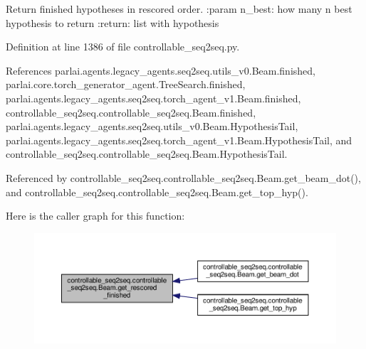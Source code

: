 \begin{DoxyVerb}Return finished hypotheses in rescored order.
:param n_best:
    how many n best hypothesis to return
:return:
    list with hypothesis
\end{DoxyVerb}
 

Definition at line 1386 of file controllable\+\_\+seq2seq.\+py.



References parlai.\+agents.\+legacy\+\_\+agents.\+seq2seq.\+utils\+\_\+v0.\+Beam.\+finished, parlai.\+core.\+torch\+\_\+generator\+\_\+agent.\+Tree\+Search.\+finished, parlai.\+agents.\+legacy\+\_\+agents.\+seq2seq.\+torch\+\_\+agent\+\_\+v1.\+Beam.\+finished, controllable\+\_\+seq2seq.\+controllable\+\_\+seq2seq.\+Beam.\+finished, parlai.\+agents.\+legacy\+\_\+agents.\+seq2seq.\+utils\+\_\+v0.\+Beam.\+Hypothesis\+Tail, parlai.\+agents.\+legacy\+\_\+agents.\+seq2seq.\+torch\+\_\+agent\+\_\+v1.\+Beam.\+Hypothesis\+Tail, and controllable\+\_\+seq2seq.\+controllable\+\_\+seq2seq.\+Beam.\+Hypothesis\+Tail.



Referenced by controllable\+\_\+seq2seq.\+controllable\+\_\+seq2seq.\+Beam.\+get\+\_\+beam\+\_\+dot(), and controllable\+\_\+seq2seq.\+controllable\+\_\+seq2seq.\+Beam.\+get\+\_\+top\+\_\+hyp().

Here is the caller graph for this function\+:
\nopagebreak
\begin{figure}[H]
\begin{center}
\leavevmode
\includegraphics[width=350pt]{classcontrollable__seq2seq_1_1controllable__seq2seq_1_1Beam_a18e46c4a301f453b669101bd539e2d53_icgraph}
\end{center}
\end{figure}
\mbox{\label{classcontrollable__seq2seq_1_1controllable__seq2seq_1_1Beam_a5224a8abe07503fe549bc6e2140eb244}} 

